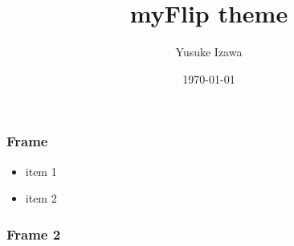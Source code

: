 \documentclass{beamer}
\title{myFlip theme}
\author{Yusuke Izawa}
\date{\today}
\begin{document}
\frame{\maketitle}

\begin{frame}
  \frametitle{Frame}
  \begin{itemize}
    \item item 1
    \item item 2
  \end{itemize}
\end{frame}

\begin{frame}
  \frametitle{Frame 2}

\end{frame}
\end{document}
